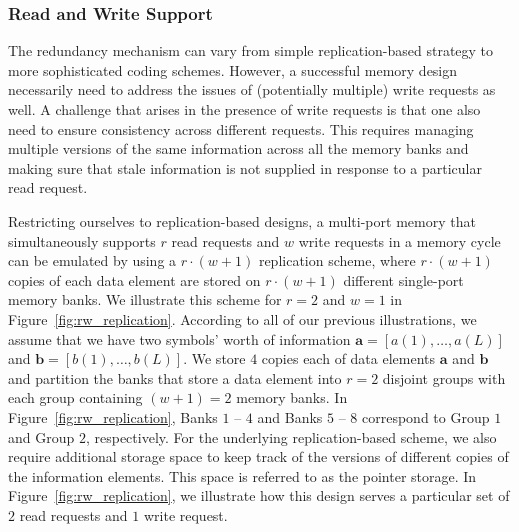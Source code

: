 \subsubsection{Read and Write Support}
\label{sec:rw}
The redundancy mechanism can vary from simple replication-based strategy to more sophisticated coding schemes. However, a successful memory design necessarily need to address the issues of (potentially multiple) write requests as well. A challenge that arises in the presence of write requests is that one also need to ensure consistency across different requests. This requires managing multiple versions of the same information across all the memory banks and making sure that stale information is not supplied in response to a particular read request. 

Restricting ourselves to replication-based designs, a multi-port memory that simultaneously supports $r$ read requests and $w$ write requests in a memory cycle can be emulated by  using a $r\cdot(w + 1)$ replication scheme, where $r\cdot(w+1)$ copies of each data element are stored on $r\cdot(w + 1)$ different single-port memory banks. We illustrate this scheme for $r = 2$ and $w = 1$ in Figure~\ref{fig:rw_replication}. According to all of our previous illustrations, we assume that we have two symbols' worth of information $\mathbf{a} = [a(1),\ldots, a(L)]$ and $\mathbf{b}  = [b(1),\ldots, b(L)]$. We store $4$ copies each of data elements $\mathbf{a}$ and $\mathbf{b}$ and partition the banks that store a data element into $r = 2$ disjoint groups with each group containing $(w + 1) = 2$ memory banks. In Figure~\ref{fig:rw_replication}, Banks $1$ -- $4$ and Banks $5$ -- $8$ correspond to Group $1$ and Group $2$, respectively. For the underlying replication-based scheme, we also require additional storage space to keep track of the versions of different copies of the information elements. This space is referred to as the pointer storage. In Figure~\ref{fig:rw_replication}, we illustrate how this design serves a particular set of $2$ read requests and $1$ write request.\\

